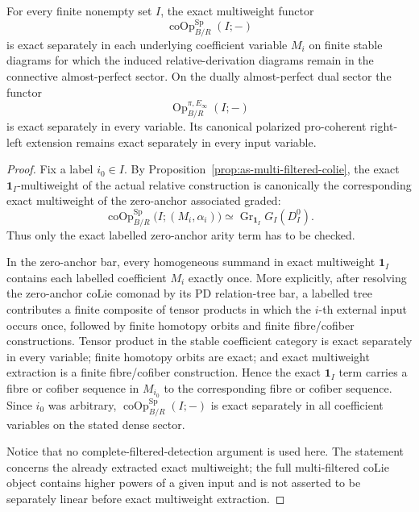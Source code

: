 \begin{proposition}
\label{prop:as-operation-separate-exactness}
For every finite nonempty set $I$, the exact multiweight functor
\[
    \operatorname{coOp}^{\mathrm{Sp}}_{B/R}(I;-)
\]
is exact separately in each underlying coefficient variable $M_i$ on finite
stable diagrams for which the induced relative-derivation diagrams remain in
the connective almost-perfect sector.  On the dually almost-perfect dual
sector the functor
\[
    \operatorname{Op}^{\pi,E_\infty}_{B/R}(I;-)
\]
is exact separately in every variable.  Its canonical polarized
pro-coherent right-left extension remains exact separately in every input
variable.
\end{proposition}

\begin{proof}
Fix a label $i_0\in I$.  By
Proposition~\ref{prop:as-multi-filtered-colie}, the exact
$\mathbf1_I$-multiweight of the actual relative construction is canonically
the corresponding exact multiweight of the zero-anchor associated graded:
\[
\operatorname{coOp}^{\mathrm{Sp}}_{B/R}
\bigl(I;(M_i,\alpha_i)\bigr)
\simeq
\operatorname{Gr}_{\mathbf1_I}G_I(D_I^0).
\]
Thus only the exact labelled zero-anchor arity term has to be checked.

In the zero-anchor bar, every homogeneous summand in exact multiweight
$\mathbf1_I$ contains each labelled coefficient $M_i$ exactly once.  More
explicitly, after resolving the zero-anchor coLie comonad by its PD
relation-tree bar, a labelled tree contributes a finite composite of tensor
products in which the $i$-th external input occurs once, followed by finite
homotopy orbits and finite fibre/cofiber constructions.  Tensor product in
the stable coefficient category is exact separately in every variable;
finite homotopy orbits are exact; and exact multiweight extraction is a finite
fibre/cofiber construction.  Hence the exact $\mathbf1_I$ term carries a
fibre or cofiber sequence in $M_{i_0}$ to the corresponding fibre or cofiber
sequence.  Since $i_0$ was arbitrary,
$\operatorname{coOp}^{\mathrm{Sp}}_{B/R}(I;-)$ is exact separately in all
coefficient variables on the stated dense sector.

Notice that no complete-filtered-detection argument is used here.  The
statement concerns the already extracted exact multiweight; the full
multi-filtered coLie object contains higher powers of a given input and is
not asserted to be separately linear before exact multiweight extraction.


\end{proof}
